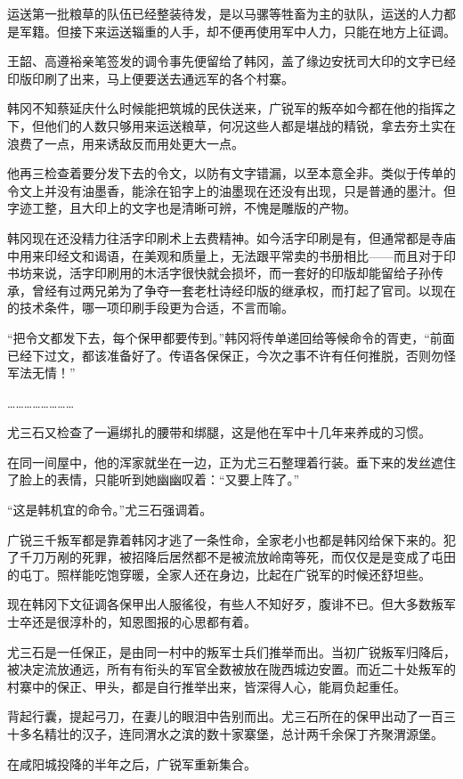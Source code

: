 运送第一批粮草的队伍已经整装待发，是以马骡等牲畜为主的驮队，运送的人力都是军籍。但接下来运送辎重的人手，却不便再使用军中人力，只能在地方上征调。

王韶、高遵裕亲笔签发的调令事先便留给了韩冈，盖了缘边安抚司大印的文字已经印版印刷了出来，马上便要送去通远军的各个村寨。

韩冈不知蔡延庆什么时候能把筑城的民伕送来，广锐军的叛卒如今都在他的指挥之下，但他们的人数只够用来运送粮草，何况这些人都是堪战的精锐，拿去夯土实在浪费了一点，用来诱敌反而用处更大一点。

他再三检查着要分发下去的令文，以防有文字错漏，以至本意全非。类似于传单的令文上并没有油墨香，能涂在铅字上的油墨现在还没有出现，只是普通的墨汁。但字迹工整，且大印上的文字也是清晰可辨，不愧是雕版的产物。

韩冈现在还没精力往活字印刷术上去费精神。如今活字印刷是有，但通常都是寺庙中用来印经文和谒语，在美观和质量上，无法跟平常卖的书册相比——而且对于印书坊来说，活字印刷用的木活字很快就会损坏，而一套好的印版却能留给子孙传承，曾经有过两兄弟为了争夺一套老杜诗经印版的继承权，而打起了官司。以现在的技术条件，哪一项印刷手段更为合适，不言而喻。

“把令文都发下去，每个保甲都要传到。”韩冈将传单递回给等候命令的胥吏，“前面已经下过文，都该准备好了。传语各保保正，今次之事不许有任何推脱，否则勿怪军法无情！”

……………………

尤三石又检查了一遍绑扎的腰带和绑腿，这是他在军中十几年来养成的习惯。

在同一间屋中，他的浑家就坐在一边，正为尤三石整理着行装。垂下来的发丝遮住了脸上的表情，只能听到她幽幽叹着：“又要上阵了。”

“这是韩机宜的命令。”尤三石强调着。

广锐三千叛军都是靠着韩冈才逃了一条性命，全家老小也都是韩冈给保下来的。犯了千刀万剐的死罪，被招降后居然都不是被流放岭南等死，而仅仅是是变成了屯田的屯丁。照样能吃饱穿暖，全家人还在身边，比起在广锐军的时候还舒坦些。

现在韩冈下文征调各保甲出人服徭役，有些人不知好歹，腹诽不已。但大多数叛军士卒还是很淳朴的，知恩图报的心思都有着。

尤三石是一任保正，是由同一村中的叛军士兵们推举而出。当初广锐叛军归降后，被决定流放通远，所有有衔头的军官全数被放在陇西城边安置。而近二十处叛军的村寨中的保正、甲头，都是自行推举出来，皆深得人心，能肩负起重任。

背起行囊，提起弓刀，在妻儿的眼泪中告别而出。尤三石所在的保甲出动了一百三十多名精壮的汉子，连同渭水之滨的数十家寨堡，总计两千余保丁齐聚渭源堡。

在咸阳城投降的半年之后，广锐军重新集合。

